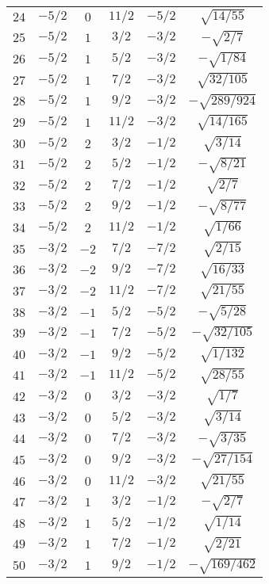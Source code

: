 \begin{table}
\begin{center}
\begin{tabular}{|c|c|c|c|c|c|}
$24$ & $-5/2$ & $0$ & $11/2$ & $-5/2$ & $\sqrt{14/55}$ \\ 
$25$ & $-5/2$ & $1$ & $3/2$ & $-3/2$ & $-\sqrt{2/7}$ \\ 
$26$ & $-5/2$ & $1$ & $5/2$ & $-3/2$ & $-\sqrt{1/84}$ \\ 
$27$ & $-5/2$ & $1$ & $7/2$ & $-3/2$ & $\sqrt{32/105}$ \\ 
$28$ & $-5/2$ & $1$ & $9/2$ & $-3/2$ & $-\sqrt{289/924}$ \\ 
$29$ & $-5/2$ & $1$ & $11/2$ & $-3/2$ & $\sqrt{14/165}$ \\ 
$30$ & $-5/2$ & $2$ & $3/2$ & $-1/2$ & $\sqrt{3/14}$ \\ 
$31$ & $-5/2$ & $2$ & $5/2$ & $-1/2$ & $-\sqrt{8/21}$ \\ 
$32$ & $-5/2$ & $2$ & $7/2$ & $-1/2$ & $\sqrt{2/7}$ \\ 
$33$ & $-5/2$ & $2$ & $9/2$ & $-1/2$ & $-\sqrt{8/77}$ \\ 
$34$ & $-5/2$ & $2$ & $11/2$ & $-1/2$ & $\sqrt{1/66}$ \\ 
$35$ & $-3/2$ & $-2$ & $7/2$ & $-7/2$ & $\sqrt{2/15}$ \\ 
$36$ & $-3/2$ & $-2$ & $9/2$ & $-7/2$ & $\sqrt{16/33}$ \\ 
$37$ & $-3/2$ & $-2$ & $11/2$ & $-7/2$ & $\sqrt{21/55}$ \\ 
$38$ & $-3/2$ & $-1$ & $5/2$ & $-5/2$ & $-\sqrt{5/28}$ \\ 
$39$ & $-3/2$ & $-1$ & $7/2$ & $-5/2$ & $-\sqrt{32/105}$ \\ 
$40$ & $-3/2$ & $-1$ & $9/2$ & $-5/2$ & $\sqrt{1/132}$ \\ 
$41$ & $-3/2$ & $-1$ & $11/2$ & $-5/2$ & $\sqrt{28/55}$ \\ 
$42$ & $-3/2$ & $0$ & $3/2$ & $-3/2$ & $\sqrt{1/7}$ \\ 
$43$ & $-3/2$ & $0$ & $5/2$ & $-3/2$ & $\sqrt{3/14}$ \\ 
$44$ & $-3/2$ & $0$ & $7/2$ & $-3/2$ & $-\sqrt{3/35}$ \\ 
$45$ & $-3/2$ & $0$ & $9/2$ & $-3/2$ & $-\sqrt{27/154}$ \\ 
$46$ & $-3/2$ & $0$ & $11/2$ & $-3/2$ & $\sqrt{21/55}$ \\ 
$47$ & $-3/2$ & $1$ & $3/2$ & $-1/2$ & $-\sqrt{2/7}$ \\ 
$48$ & $-3/2$ & $1$ & $5/2$ & $-1/2$ & $\sqrt{1/14}$ \\ 
$49$ & $-3/2$ & $1$ & $7/2$ & $-1/2$ & $\sqrt{2/21}$ \\ 
$50$ & $-3/2$ & $1$ & $9/2$ & $-1/2$ & $-\sqrt{169/462}$ \\ 

\end{tabular}
\end{center}
\end{table}
